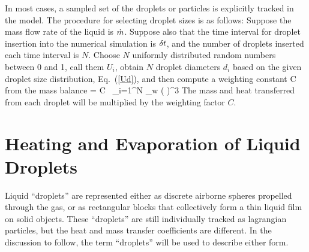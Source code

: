 In most cases, a sampled set of the droplets or particles is explicitly tracked in the model.
The procedure for selecting droplet sizes is as follows:
Suppose the mass flow rate of the liquid is $\dot{m}$.
Suppose also that the time interval for droplet insertion
into the numerical simulation is $\delta t$, and the number of droplets
inserted each time interval is $N$. Choose $N$ uniformly distributed random
numbers between 0 and 1, call them $U_i$,
obtain $N$ droplet diameters $d_i$ based on the
given droplet size distribution, Eq.~(\ref{Ud}), and then compute
a weighting constant C from the mass balance
\be \dm \; \dt = C \, \sum_{i=1}^N \;   \pi \rho_w
      \left(  \right)^3 \ee
The mass and heat transferred from each droplet will be multiplied by
the weighting factor $C$.


\section{Heating and Evaporation of Liquid Droplets}

Liquid ``droplets'' are represented either as discrete airborne spheres propelled through the gas,
or as rectangular blocks that collectively form a thin liquid film on solid objects.
These ``droplets'' are still individually tracked as
lagrangian particles, but the heat and mass transfer coefficients are different.
In the discussion to follow, the term ``droplets'' will be used to describe either form.

